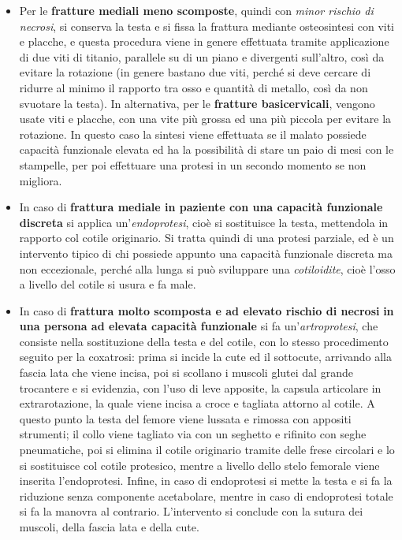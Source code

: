 \documentclass[]{article}
\begin{document}
\begin{itemize}
\item
  Per le \textbf{fratture mediali meno scomposte}, quindi con
  \emph{minor rischio di necrosi}, si conserva la testa e si fissa la
  frattura mediante osteosintesi con viti e placche, e questa procedura
  viene in genere effettuata tramite applicazione di due viti di
  titanio, parallele su di un piano e divergenti sull'altro, così da
  evitare la rotazione (in genere bastano due viti, perché si deve
  cercare di ridurre al minimo il rapporto tra osso e quantità di
  metallo, così da non svuotare la testa). In alternativa, per le
  \textbf{fratture basicervicali}, vengono usate viti e placche, con una
  vite più grossa ed una più piccola per evitare la rotazione. In questo
  caso la sintesi viene effettuata se il malato possiede capacità
  funzionale elevata ed ha la possibilità di stare un paio di mesi con
  le stampelle, per poi effettuare una protesi in un secondo momento se
  non migliora.
\item
  In caso di \textbf{frattura mediale in paziente con una capacità
  funzionale discreta} si applica un'\emph{endoprotesi}, cioè si
  sostituisce la testa, mettendola in rapporto col cotile originario. Si
  tratta quindi di una protesi parziale, ed è un intervento tipico di
  chi possiede appunto una capacità funzionale discreta ma non
  eccezionale, perché alla lunga si può sviluppare una
  \emph{cotiloidite}, cioè l'osso a livello del cotile si usura e fa
  male.
\item
  In caso di \textbf{frattura molto scomposta e ad elevato rischio di
  necrosi} \textbf{in una persona ad elevata capacità funzionale} si fa
  un'\emph{artroprotesi}, che consiste nella sostituzione della testa e
  del cotile, con lo stesso procedimento seguito per la coxatrosi: prima
  si incide la cute ed il sottocute, arrivando alla fascia lata che
  viene incisa, poi si scollano i muscoli glutei dal grande trocantere e
  si evidenzia, con l'uso di leve apposite, la capsula articolare in
  extrarotazione, la quale viene incisa a croce e tagliata attorno al
  cotile. A questo punto la testa del femore viene lussata e rimossa con
  appositi strumenti; il collo viene tagliato via con un seghetto e
  rifinito con seghe pneumatiche, poi si elimina il cotile originario
  tramite delle frese circolari e lo si sostituisce col cotile
  protesico, mentre a livello dello stelo femorale viene inserita
  l'endoprotesi. Infine, in caso di endoprotesi si mette la testa e si
  fa la riduzione senza componente acetabolare, mentre in caso di
  endoprotesi totale si fa la manovra al contrario. L'intervento si
  conclude con la sutura dei muscoli, della fascia lata e della cute.
\end{itemize}
\end{document}
